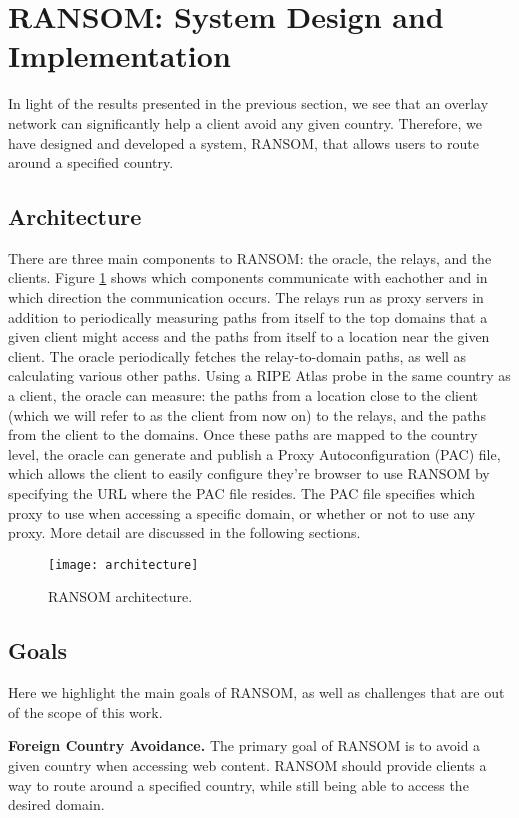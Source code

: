 \section{RANSOM: System Design and Implementation}
In light of the results presented in the previous section, we see that an 
overlay network can significantly help a client avoid any given country.  
Therefore, we have designed and developed a system, RANSOM, that allows users 
to route around a specified country.

\subsection{Architecture}

There are three main components to RANSOM: the oracle, the relays, and the 
clients.  Figure \ref{fig:arch} shows which components communicate with 
eachother and in which direction the communication occurs.  The relays run as 
proxy servers in addition to periodically measuring paths from itself to the 
top domains that a given client might access and the paths from itself to a 
location near the given client.  The oracle periodically fetches the 
relay-to-domain paths, as well as calculating various other paths.  Using a RIPE
 Atlas probe in the same country as a client, the oracle can measure: the paths
 from a location close to the client (which we will refer to as the client from 
now on) to the relays, and the paths from the client to the domains.  Once these
 paths are mapped to the country level, the oracle can generate and publish a 
Proxy Autoconfiguration (PAC) file, which allows the client to easily configure 
they're browser to use RANSOM by specifying the URL where the PAC file resides.
  The PAC file specifies which proxy to use when accessing a specific domain, 
or whether or not to use any proxy.  More detail are discussed in the following 
sections.

\begin{figure}[t]
\centering
\texttt{[image: architecture]}
\caption{RANSOM architecture.}
\label{fig:arch}
\end{figure}

\subsection{Goals}
Here we highlight the main goals of RANSOM, as well as challenges that are out 
of the scope of this work.

{\bf Foreign Country Avoidance.}  The primary goal of RANSOM is to avoid a given
 country when accessing web content.  RANSOM should provide clients a way to 
route around a specified country, while still being able to access the desired 
domain.

